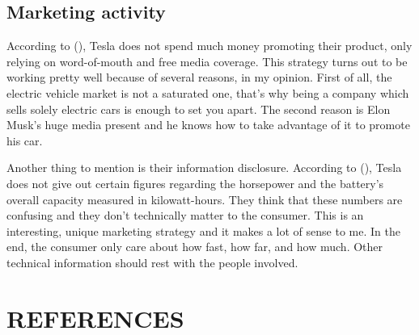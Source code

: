 \documentclass[12pt]{article}
\providecommand\phantomsection{} %
\begin{document}
\subsection{Marketing activity}

According to (\cite{schu17}), Tesla does not spend much money promoting their product, only relying on word-of-mouth and free media coverage. This strategy turns out to be working pretty well because of several reasons, in my opinion. First of all, the electric vehicle market is not a saturated one, that's why being a company which sells solely electric cars is enough to set you apart. The second reason is Elon Musk's huge media present and he knows how to take advantage of it to promote his car.

Another thing to mention is their information disclosure. According to (\cite{kro17}), Tesla does not give out certain figures regarding the horsepower and the battery's overall capacity measured in kilowatt-hours. They think that these numbers are confusing and they don't technically matter to the consumer. This is an interesting, unique marketing strategy and it makes a lot of sense to me. In the end, the consumer only care about how fast, how far, and how much. Other technical information should rest with the people involved.



\clearpage

\begingroup 
\linespread{1}

\setlength\bibitemsep{\baselineskip}

\setlength{\bibhang}{0pt}

\section*{REFERENCES}
\phantomsection
{}%

\printbibliography[heading=none]
\endgroup
\end{document}
